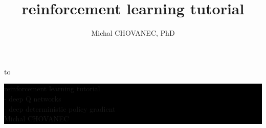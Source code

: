 \documentclass[xcolor=dvipsnames]{beamer}
\title{\color{white} \bf reinforcement learning tutorial}
\author{\color{white} Michal CHOVANEC, PhD}
\date[EURP]{}
\begin{document}
{
    \usebackgroundtemplate
    {
        \vbox to 
    }



    \begin{frame}

    \centering
     \colorbox{black}
     {
        \begin{minipage}{8cm}
           {\LARGE \color{white}reinforcement learning tutorial} \\
           {\Large \color{white}- deep Q networks} \\
           {\Large \color{white}- deep deterministic policy gradient} \\
           {\LARGE \color{white} Michal CHOVANEC} \\
       \end{minipage}
     }

    \end{frame}
}
\end{document}
